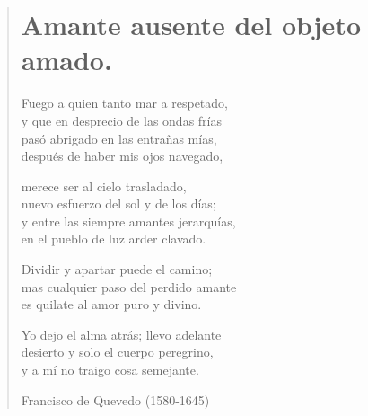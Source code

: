 \documentclass[12pt, twoside]{book}
\begin{document}
\newpage
\begin{verse}
\begin{center}
\section{Amante ausente del objeto amado.}
\end{center}
Fuego a quien tanto mar a respetado,\\
y que en desprecio de las ondas frías\\
pasó abrigado en las entrañas mías,\\
después de haber mis ojos navegado,
\newline

merece ser al cielo trasladado,\\
nuevo esfuerzo del sol y de los días;\\
y entre las siempre amantes jerarquías,\\
en el pueblo de luz arder clavado.
\newline

Dividir y apartar puede el camino;\\
mas cualquier paso del perdido amante\\
es quilate al amor puro y divino.
\newline

Yo dejo el alma atrás; llevo adelante\\
desierto y solo el cuerpo peregrino,\\
y a mí no traigo cosa semejante.
\newline

Francisco de Quevedo (1580-1645)
\end{verse}
\end{document}
